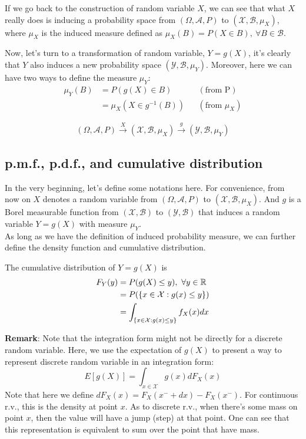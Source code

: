\documentclass[../Transformation.tex]{subfiles}
\begin{document}
If we go back to the construction of random variable $X$, we can see that what $X$ really does is inducing a probability space from $(\Omega,\mathcal{A},P)$ to $(\mathcal{X},\mathcal{B},\mu_X)$, where $\mu_X$ is the induced measure defined as $\mu_X(B) = P(X\in B),\ \forall B\in\mathcal{B}$.

Now, let's turn to a transformation of random variable, $Y = g(X)$, it's clearly that $Y$ also induces a new probability space $(\mathcal{Y},\mathcal{B},\mu_Y)$. Moreover, here we can have two ways to define the measure $\mu_Y$:
\begin{align*}
\mu_Y(B) &= P(g(X)\in B) && (\mbox{from P})\\
&=\mu_X(X\in g^{-1}(B)) && (\mbox{from $\mu_X$})
\end{align*}

\begin{intuition}[transformation]
	$$(\Omega,\mathcal{A},P)\xrightarrow{X}(\mathcal{X},\mathcal{B},\mu_X)\xrightarrow{g}(\mathcal{Y},\mathcal{B},\mu_Y)$$
\end{intuition}

\subsection{p.m.f., p.d.f., and cumulative distribution}
In the very beginning, let's define some notations here. For convenience, from now on $X$ denotes a random variable from $(\Omega,\mathcal{A},P)$ to $(\mathcal{X},\mathcal{B},\mu_X)$. And $g$ is a Borel measurable function from $(\mathcal{X},\mathcal{B})$ to $(\mathcal{Y},\mathcal{B})$ that induces a random variable $Y=g(X)$ with measure $\mu_Y$.\\

As long as we have the definition of induced probability measure, we can further define the density function and cumulative distribution.
\begin{property}
	The cumulative distribution of $Y=g(X)$ is
	\begin{align*}
	F_Y(y) &= P(g(X)\leq y),\ \forall y\in{\mathbb R}\\
	&=P(\{x\in\mathcal{X}: g(x)\leq y \})\\
	&=\int_{\{x\in\mathcal{X}: g(x)\leq y \}} f_X(x)dx
	\end{align*}
\end{property}

{\bf Remark}: Note that the integration form might not be directly for a discrete random variable. Here, we use the expectation of $g(X)$ to present a way to represent discrete random variable in an integration form:
$$E[g(X)] = \int_{x\in\mathcal{X}} g(x)dF_X(x)$$
Note that here we define $dF_X(x) = F_X(x^-+dx)-F_X(x^-)$. For continuous r.v., this is the density at point $x$. As to discrete r.v., when there's some mass on point $x$, then the value will have a jump (step) at that point. One can see that this representation is equivalent to sum over the point that have mass.\\
\end{document}
